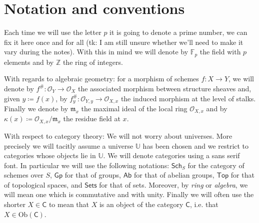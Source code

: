 \section*{Notation and conventions}
Each time we will use the letter $p$ it is going to denote a prime number,
we can fix it here once and for all (tk: I am still unsure whether we'll
need to make it vary during the notes).
With this in mind we will denote by $\mathbb{F}_{p}$ the field with $p$ elements
and by $\mathbb{Z}$ the ring of integers.


With regards to algebraic geometry: for a morphism of schemes $f\colon X \to Y$,
we will denote by $f^{\#}\colon \mathcal{O}_{ Y } \to \mathcal{O}_{ X }$ the
associated morphism between structure sheaves and, given $y \coloneqq f(x)$,
by $f_y^{\#}\colon \mathcal{O}_{ Y,y } \to \mathcal{O}_{ X,x }$ the induced morphism
at the level of stalks.
Finally we denote by $\mathfrak{m}_x$ the maximal ideal of the local ring
$\mathcal{O}_{ X,x }$ and by $\kappa(x) \coloneqq \mathcal{O}_{ X,x }/\mathfrak{m}_x$
the residue field at $x$.

With respect to category theory:
We will not worry about universes. More precisely we will
tacitly assume a universe $\mathbb{U}$ has been chosen
and we restrict to categories whose objects lie in $\mathbb{U}$.
We will denote categories using a sans serif font.
In particular we will use the following notations:
$\mathsf{Sch}_{S}$ for the category of schemes over $S$,
$\mathsf{Gp}$ for that of groups,
$\mathsf{Ab}$ for that of abelian groups,
$\mathsf{Top}$ for that of topological spaces,
and $\mathsf{Sets}$ for that of sets.
Moreover, by {\em ring} or {\em algebra}, we will mean one which is commutative and with unity.
Finally we will often use the shorter $X \in \mathsf{C}$ to mean that $X$ is an object
of the category $\mathsf{C}$, i.e. that $X \in \mathrm{Ob} \left(\mathsf{C}\right)$.
